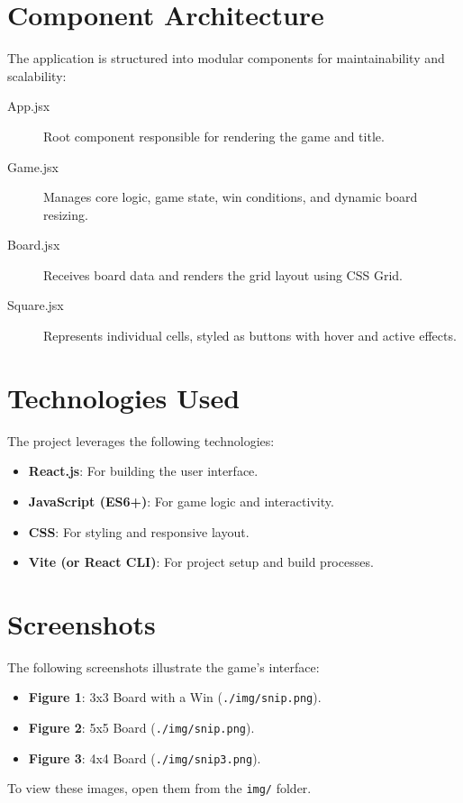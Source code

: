 \documentclass[a4paper,12pt]{article}
\begin{document}
\section{Component Architecture}
The application is structured into modular components for maintainability and scalability:
\begin{description}
    \item[App.jsx] Root component responsible for rendering the game and title.
    \item[Game.jsx] Manages core logic, game state, win conditions, and dynamic board resizing.
    \item[Board.jsx] Receives board data and renders the grid layout using CSS Grid.
    \item[Square.jsx] Represents individual cells, styled as buttons with hover and active effects.
\end{description}

\section{Technologies Used}
The project leverages the following technologies:
\begin{itemize}
    \item \textbf{React.js}: For building the user interface.
    \item \textbf{JavaScript (ES6+)}: For game logic and interactivity.
    \item \textbf{CSS}: For styling and responsive layout.
    \item \textbf{Vite (or React CLI)}: For project setup and build processes.
\end{itemize}

\section{Screenshots}
The following screenshots illustrate the game’s interface:
\begin{itemize}
    \item \textbf{Figure 1}: 3x3 Board with a Win (\texttt{./img/snip.png}).
    \item \textbf{Figure 2}: 5x5 Board (\texttt{./img/snip.png}).
    \item \textbf{Figure 3}: 4x4 Board (\texttt{./img/snip3.png}).
\end{itemize}
To view these images, open them from the \texttt{img/} folder.
\end{document}
